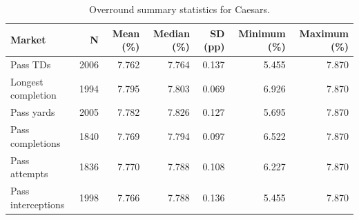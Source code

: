 \begin{table}
\caption{Overround summary statistics for Caesars.}
\label{tab:overround_caesars}
\begin{tabular}{lrrrrrr}
\toprule
Market & N & Mean (\%) & Median (\%) & SD (pp) & Minimum (\%) & Maximum (\%) \\
\midrule
Pass TDs & 2006 & 7.762 & 7.764 & 0.137 & 5.455 & 7.870 \\
Longest completion & 1994 & 7.795 & 7.803 & 0.069 & 6.926 & 7.870 \\
Pass yards & 2005 & 7.782 & 7.826 & 0.127 & 5.695 & 7.870 \\
Pass completions & 1840 & 7.769 & 7.794 & 0.097 & 6.522 & 7.870 \\
Pass attempts & 1836 & 7.770 & 7.788 & 0.108 & 6.227 & 7.870 \\
Pass interceptions & 1998 & 7.766 & 7.788 & 0.136 & 5.455 & 7.870 \\
\bottomrule
\end{tabular}
\end{table}
